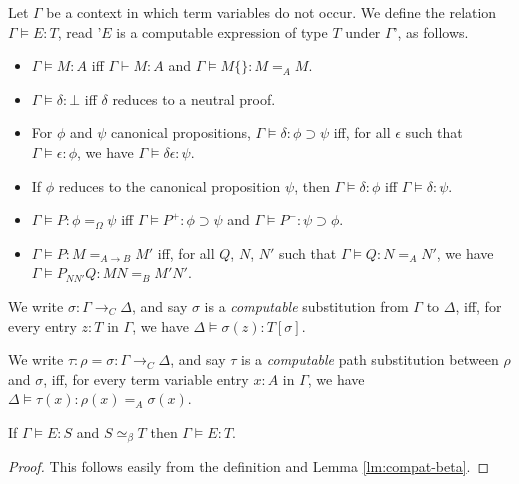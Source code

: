 \documentclass[a4paper,UKenglish]{lipics-v2016}
\theoremstyle{plain}
\begin{document}
\begin{definition}
Let $\Gamma$ be a context in which term variables do not occur.
We define the relation $\Gamma \models E : T$, read '$E$ is a computable expression of type $T$ under $\Gamma$', as follows.
\begin{itemize}
\item
$\Gamma \models M : A$ iff $\Gamma \vdash M : A$ and $\Gamma \models M \{\} : M =_A M$.
\item
$\Gamma \models \delta : \bot$ iff $\delta$ reduces to a neutral proof.
\item
For $\phi$ and $\psi$ canonical propositions, $\Gamma \models \delta : \phi \supset \psi$ iff, for all $\epsilon$ such that $\Gamma \models \epsilon : \phi$, we have $\Gamma \models \delta \epsilon : \psi$.
\item
If $\phi$ reduces to the canonical proposition $\psi$, then $\Gamma \models \delta : \phi$ iff $\Gamma \models \delta : \psi$.
\item
$\Gamma \models P : \phi =_\Omega \psi$ iff $\Gamma \models P^+ : \phi \supset \psi$ and $\Gamma \models P^- : \psi \supset \phi$.
\item
$\Gamma \models P : M =_{A \rightarrow B} M'$ iff, for all $Q$, $N$, $N'$ such that $\Gamma \models Q : N =_A N'$, we have $\Gamma \models P_{NN'}Q : MN =_B M'N'$.
\end{itemize}
\end{definition}

\begin{definition}
We write $\sigma : \Gamma \rightarrow_C \Delta$, and say $\sigma$ is a \emph{computable} substitution from $\Gamma$ to $\Delta$, iff, for every entry $z : T$ in $\Gamma$, we have $\Delta \models \sigma(z) : T [ \sigma ]$.

We write $\tau : \rho = \sigma : \Gamma \rightarrow_C \Delta$, and say $\tau$ is a \emph{computable} path substitution between $\rho$ and $\sigma$, iff, for every term variable entry $x : A$ in $\Gamma$, we have $\Delta \models \tau(x) : \rho(x) =_A \sigma(x)$.
\end{definition}

\begin{lemma}
\label{lm:conv-compute}
If $\Gamma \models E : S$ and $S \simeq_\beta T$ then $\Gamma \models E : T$.
\end{lemma}

\begin{proof}
This follows easily from the definition and Lemma \ref{lm:compat-beta}.
\end{proof}
\end{document}
